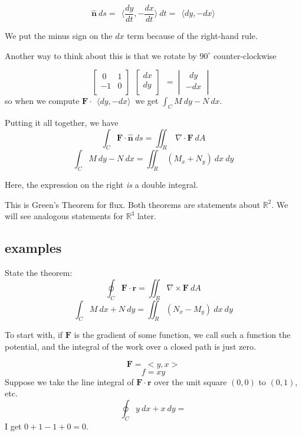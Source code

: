 \documentclass[11pt, oneside]{article}
\begin{document}
\[ \hat{\mathbf{n}} \ ds = \ \ \langle \frac{dy}{dt},-\frac{dx}{dt} \rangle \  dt = \ \ \langle dy, -dx \rangle \]

We put the minus sign on the $dx$ term because of the right-hand rule.

Another way to think about this is that we rotate by $90^{ \circ}$ counter-clockwise

\[
\begin{bmatrix} 
  \ 0  &  1 \\ 
  -1  &   0  \\ 
\end{bmatrix} \ \ 
\begin{bmatrix} 
  dx  \\ 
  dy  \\ 
\end{bmatrix} \ \ 
=
\begin{vmatrix} 
  \ \ dy  \\ 
  -dx  \\ 
\end{vmatrix} \ \ 
\]
so when we compute $\mathbf{F} \cdot \ \ \langle dy,-dx \rangle \ $ we get $\int_C M \ dy - N \ dx$.  

Putting it all together, we have
\[ \int_C \mathbf{F} \cdot \hat{\mathbf{n}} \  ds =  \iint_R \ \nabla \cdot \mathbf{F} \ dA  \]
\[ \int_C M \ dy - N \ dx =  \iint_R \ (M_x + N_y) \ dx \ dy \]

Here, the expression on the right \emph{is} a double integral.

This is Green's Theorem for flux.  Both theorems are statements about $\mathbb{R}^2$.  We will see analogous statements for $\mathbb{R}^3$ later.

\subsection*{examples}

State the theorem:
\[ \oint_C \mathbf{F} \cdot \mathbf{r} = \iint_R \nabla \times \mathbf{F} \ dA \]
\[ \int_C M \ dx + N \ dy = \iint_R (N_x - M_y) \ dx \ dy \]

To start with, if $\mathbf{F}$ is the gradient of some function, we call such a function the potential, and the integral of the work over a closed path is just zero.

\[ \mathbf{F} = \ <y,x> \]
\[ f = xy \]
Suppose we take the line integral of $\mathbf{F}\cdot \mathbf{r}$  over the unit square $(0,0)$ to $(0,1)$, etc.
\[ \oint_C y \ dx + x \ dy = \]
I get $0 + 1 -1 + 0 = 0$.
\end{document}

